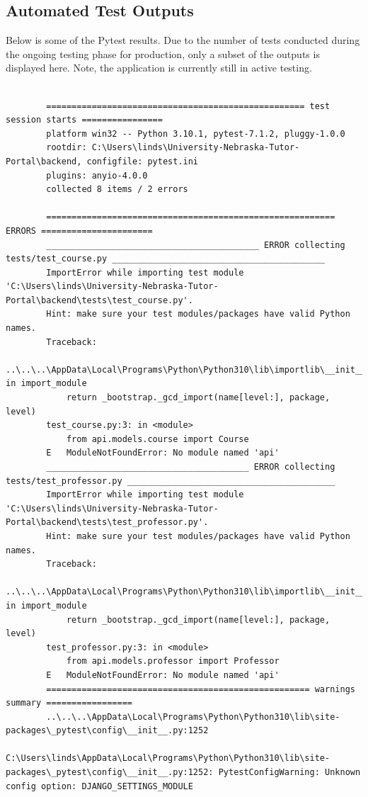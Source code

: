 \documentclass[oneside,openany,obeyspaces]{book}
\newcommand\tab[1][1cm]{\hspace*{#1}}
\begin{document}
\begin{flushleft}
    \section{Automated Test Outputs}

    \tab Below is some of the Pytest results. Due to the  number of tests conducted during the ongoing testing phase for production, only a subset of the outputs is displayed here. Note, the application is currently still in active testing.\\~\\

    \begin{verbatim}
        =================================================== test session starts ================
        platform win32 -- Python 3.10.1, pytest-7.1.2, pluggy-1.0.0
        rootdir: C:\Users\linds\University-Nebraska-Tutor-Portal\backend, configfile: pytest.ini
        plugins: anyio-4.0.0
        collected 8 items / 2 errors
        
        ========================================================= ERRORS ======================
        __________________________________________ ERROR collecting tests/test_course.py __________________________________________ 
        ImportError while importing test module 'C:\Users\linds\University-Nebraska-Tutor-Portal\backend\tests\test_course.py'.     
        Hint: make sure your test modules/packages have valid Python names.
        Traceback:
        ..\..\..\AppData\Local\Programs\Python\Python310\lib\importlib\__init__.py:126: in import_module
            return _bootstrap._gcd_import(name[level:], package, level)
        test_course.py:3: in <module>
            from api.models.course import Course
        E   ModuleNotFoundError: No module named 'api'
        ________________________________________ ERROR collecting tests/test_professor.py _________________________________________ 
        ImportError while importing test module 'C:\Users\linds\University-Nebraska-Tutor-Portal\backend\tests\test_professor.py'.  
        Hint: make sure your test modules/packages have valid Python names.
        Traceback:
        ..\..\..\AppData\Local\Programs\Python\Python310\lib\importlib\__init__.py:126: in import_module
            return _bootstrap._gcd_import(name[level:], package, level)
        test_professor.py:3: in <module>
            from api.models.professor import Professor
        E   ModuleNotFoundError: No module named 'api'
        ==================================================== warnings summary ================= 
        ..\..\..\AppData\Local\Programs\Python\Python310\lib\site-packages\_pytest\config\__init__.py:1252
          C:\Users\linds\AppData\Local\Programs\Python\Python310\lib\site-packages\_pytest\config\__init__.py:1252: PytestConfigWarning: Unknown config option: DJANGO_SETTINGS_MODULE
        

\end{verbatim}
\end{flushleft}
\end{document}
